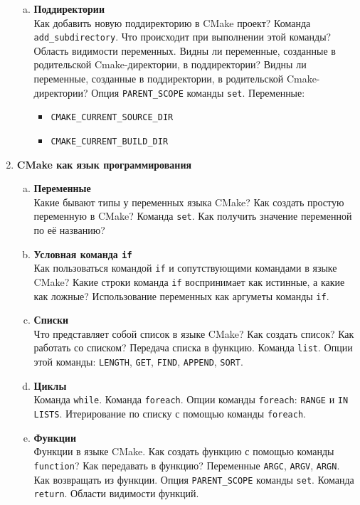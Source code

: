 \documentclass{article}
\begin{document}
\begin{enumerate}
\begin{enumerate}[a.]
\item \textbf{Поддиректории}\\
Как добавить новую поддиректорию в CMake проект? Команда \texttt{add\_subdirectory}. Что происходит при выполнении этой команды?
Область видимости переменных. Видны ли переменные, созданные в родительской Cmake-директории, в поддиректории? Видны ли переменные, созданные в поддиректории, в родительской Cmake-директории? Опция \texttt{PARENT\_SCOPE} команды \texttt{set}. Переменные:
\begin{itemize}
\item \texttt{CMAKE\_CURRENT\_SOURCE\_DIR}
\item \texttt{CMAKE\_CURRENT\_BUILD\_DIR}
\end{itemize}

\end{enumerate}





\item \textbf{CMake как язык программирования}
\begin{enumerate}[a.]

\item \textbf{Переменные}\\
Какие бывают типы у переменных языка CMake? Как создать простую переменную в CMake? Команда \texttt{set}. Как получить значение переменной по её названию?

\item \textbf{Условная команда \texttt{if}}\\
Как пользоваться командой \texttt{if} и сопутствующими командами в языке CMake? Какие строки команда \texttt{if} воспринимает как истинные, а какие как ложные? Использование переменных как аргуметы команды \texttt{if}.

\item \textbf{Списки}\\
Что представляет собой список в языке CMake? Как создать список? Как работать со списком? Передача списка в функцию. Команда \texttt{list}. Опции этой команды: \texttt{LENGTH}, \texttt{GET}, \texttt{FIND}, \texttt{APPEND}, \texttt{SORT}. 

\item \textbf{Циклы}\\
Команда \texttt{while}. Команда \texttt{foreach}. Опции команды \texttt{foreach}: \texttt{RANGE} и \texttt{IN LISTS}. Итерирование по списку с помощью команды \texttt{foreach}.

\item \textbf{Функции}\\
Функции в языке CMake. Как создать функцию с помощью команды \texttt{function}? Как передавать в функцию? Переменные \texttt{ARGC}, \texttt{ARGV}, \texttt{ARGN}. Как возвращать из функции. Опция \texttt{PARENT\_SCOPE} команды \texttt{set}. Команда \texttt{return}. Области видимости функций.


\end{enumerate}
\end{enumerate}
\end{document}
